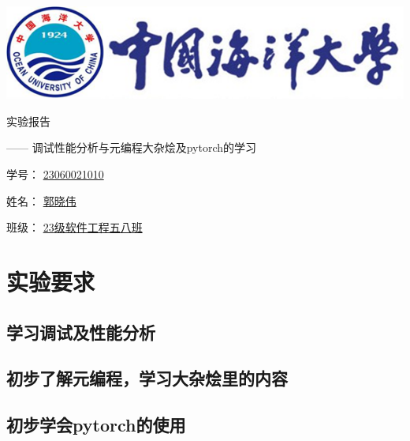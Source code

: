 \documentclass[UTF8,a4paper]{ctexart}
\begin{document}
\begin{sloppypar}


	\begin{center}
	\includegraphics[width = 14cm]{picture/s1}

		\begin{fontsize}{60pt}{20pt}
			实验报告
		\end{fontsize}

		\bigskip
		\bigskip
		
		\begin{fontsize}{20pt}{20pt}
			\begin{flushright}
				—— 调试性能分析与元编程大杂烩及{\Huge pytorch}的学习
			\end{flushright}
		\end{fontsize}
		
		\bigskip
		\bigskip
		\bigskip
		\bigskip
		\bigskip
		\bigskip
		\bigskip
		\bigskip
		\bigskip
		\bigskip
		\bigskip
		\bigskip
		\bigskip
		\bigskip
		\bigskip
		\bigskip
		
		\begin{fontsize}{25pt}{20pt}

			学号：
			\underline{{\huge 23060021010}}
			\bigskip
			\bigskip
			\bigskip
			\bigskip

			姓名：
			\underline{郭晓伟}
			\bigskip
			\bigskip
			\bigskip
			\bigskip

			班级：
			\underline{{\Huge 23}级软件工程五八班}
				
		\end{fontsize}
	\end{center}
	\section{实验要求}
	\subsection{学习调试及性能分析}
	\subsection{初步了解元编程，学习大杂烩里的内容}
	\subsection{初步学会pytorch的使用}

\end{sloppypar}
\end{document}
